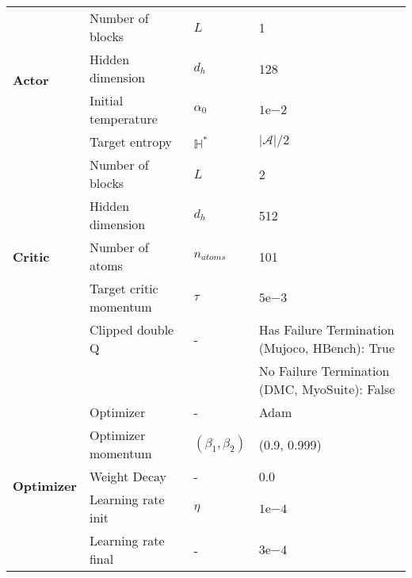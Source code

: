 \begin{table}[ht]
{\begin{tabular}{llll}
\midrule
\multirow{4}{*}{\textbf{Actor}} 
& Number of blocks & $L$ & 1 \\
& Hidden dimension & $d_h$ & 128 \\
& Initial temperature & $\alpha_0$ & $1\mathrm{e}{-2}$
\\
& Target entropy & $\mathbb{H}^*$ & $\vert\mathcal{A}\vert/2$ \\ \midrule
\multirow{5}{*}{\textbf{Critic}} 
& Number of blocks & $L$ & 2 \\
& Hidden dimension & $d_h$ & 512 \\
& Number of atoms  & $n_{atoms}$ & 101 \\
& Target critic momentum & $\tau$ & $5\mathrm{e}{-3}$
 \\ 
& Clipped double Q               & - & Has Failure Termination (Mujoco, HBench): True \\ 
&                                &   & No Failure Termination (DMC, MyoSuite): False \\
\midrule
\multirow{5}{*}{\textbf{Optimizer}} 
& Optimizer          & - & Adam \\
& Optimizer momentum & $(\beta_1, \beta_2)$ & (0.9, 0.999) \\
& Weight Decay       & - & 0.0 \\
& Learning rate init & $\eta$ & $1\mathrm{e}{-4}$
 \\
& Learning rate final & - & $3\mathrm{e}{-4}$ \\ 
\bottomrule
\end{tabular}
}
\end{table} %